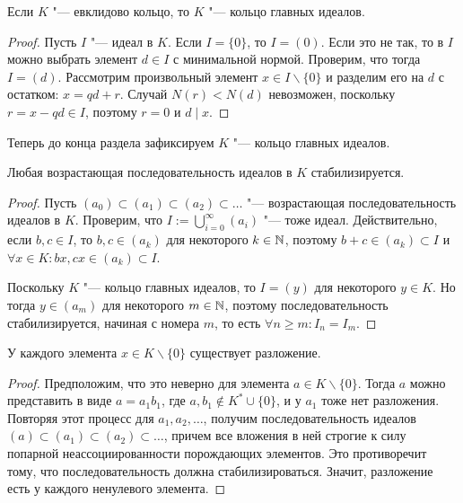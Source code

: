 \begin{theorem}
	Если $K$ "--- евклидово кольцо, то $K$ "--- кольцо главных идеалов.
\end{theorem}

\begin{proof}
	Пусть $I$ "--- идеал в $K$. Если $I = \{0\}$, то $I = (0)$. Если это не так, то в $I$ можно выбрать элемент $d \in I$ с минимальной нормой. Проверим, что тогда $I = (d)$. Рассмотрим произвольный элемент $x \in I \backslash \{0\}$ и разделим его на $d$ с остатком: $x = qd + r$. Случай $N(r) < N(d)$ невозможен, поскольку $r = x - qd \in I$, поэтому $r = 0$ и $d \mid x$.
\end{proof}

Теперь до конца раздела зафиксируем $K$ "--- кольцо главных идеалов.

\begin{proposition}
	Любая возрастающая последовательность идеалов в $K$ стабилизируется.
\end{proposition}

\begin{proof}
	Пусть $(a_0) \subset (a_1) \subset (a_2) \subset \dotsc$ "--- возрастающая последовательность идеалов в $K$. Проверим, что $I := \bigcup_{i = 0}^\infty (a_i)$ "--- тоже идеал. Действительно, если $b, c \in I$, то $b, c \in (a_k)$ для некоторого $k \in \mathbb{N}$, поэтому $b + c \in (a_k) \subset I$ и $\forall x \in K: bx, cx \in (a_k) \subset I$.
	
	Поскольку $K$ "--- кольцо главных идеалов, то $I = (y)$ для некоторого $y \in K$. Но тогда $y \in (a_m)$ для некоторого $m \in \mathbb{N}$, поэтому последовательность стабилизируется, начиная с номера $m$, то есть $\forall n \ge m: I_n = I_m$.
\end{proof}

\begin{proposition}
	У каждого элемента $x \in K \backslash \{0\}$ существует разложение.
\end{proposition}

\begin{proof}
	Предположим, что это неверно для элемента $a \in K \backslash \{0\}$. Тогда $a$ можно представить в виде $a = a_1b_1$, где $a, b_1 \not\in K^* \cup \{0\}$, и у $a_1$ тоже нет разложения. Повторяя этот процесс для $a_1, a_2, \dotsc$, получим последовательность идеалов $(a) \subset (a_1) \subset (a_2) \subset \dots$, причем все вложения в ней строгие к силу попарной неассоциированности порождающих элементов. Это противоречит тому, что последовательность должна стабилизироваться. Значит, разложение есть у каждого ненулевого элемента.
\end{proof}

